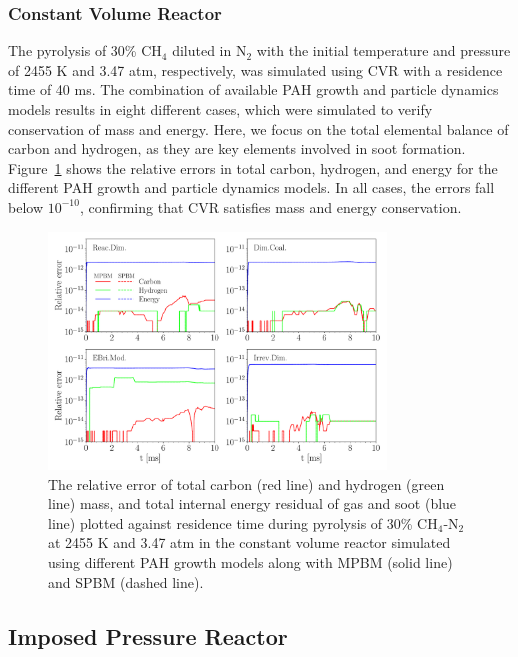 \subsubsection{Constant Volume Reactor}
The pyrolysis of 30\% $\mathrm{CH_4}$ diluted in $\mathrm{N_2}$ with the initial temperature and pressure of 2455 K and 3.47 atm, respectively, was simulated using CVR with a residence time of 40 ms. The combination of available PAH growth and particle dynamics models results in eight different cases, which were simulated to verify conservation of mass and energy. Here, we focus on the total elemental balance of carbon and hydrogen, as they are key elements involved in soot formation.
Figure~\ref{fig:constuvvalid} shows the relative errors in total carbon, hydrogen, and energy for the different PAH growth and particle dynamics models. In all cases, the errors fall below $\mathrm{10^{-10}}$, confirming that CVR satisfies mass and energy conservation.
\begin{figure}[H]
	\centering
	\includegraphics[width=0.8\textwidth]{Figures/Results/Validation/ConstUV/relerr_constuv.pdf}
	\caption{The relative error of total carbon (red line) and hydrogen (green line) mass, and total internal energy residual of gas and soot (blue line) plotted against residence time during pyrolysis of 30\% $\mathrm{CH_4}$-$\mathrm{N_2}$ at 2455 K and 3.47 atm in the constant volume reactor simulated using different PAH growth models along with MPBM (solid line) and SPBM (dashed line).}
	\label{fig:constuvvalid}
\end{figure}



\subsection{Imposed Pressure Reactor}

